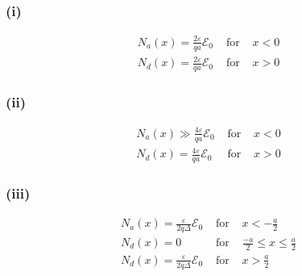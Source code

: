\subsubsection*{(i)}
\[\begin{array}{lll}N_{a}(x)=\frac{2 \varepsilon}{q a} \mathscr{E}_{0} & \text { for } & x<0 \\N_{d}(x)=\frac{2 \varepsilon}{q a} \mathscr{E}_{0} & \text { for } & x>0\end{array}\]
\subsubsection*{(ii)}
\[\begin{array}{lll}N_{a}(x) \gg \frac{4 \varepsilon}{q a} \mathscr{E}_{0} & \text { for } & x<0 \\N_{d}(x)=\frac{4 \varepsilon}{q a} \mathscr{E}_{0} & \text { for } & x>0\end{array}\]
\subsubsection*{(iii)}
\[\begin{array}{lll}N_{a}(x)=\frac{\varepsilon}{2 q \Delta} \mathscr{E}_{0} & \text { for } & x<-\frac{a}{2} \\N_{d}(x)=0 & \text { for } & \frac{-a}{2} \leq x \leq \frac{a}{2} \\N_{d}(x)=\frac{\varepsilon}{2 q \Delta} \mathscr{E}_{0} & \text { for } & x>\frac{a}{2}\end{array}\]

